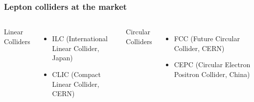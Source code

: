 \documentclass[aspectratio=169]{beamer}
\newcommand{\bluetext}[1]{%
  \textcolor{myBlue}{#1}
}
\begin{document}
\begin{frame}
  \frametitle{Lepton colliders at the market}

  \begin{columns}[c]
    \bluetext{Linear Colliders}
    \begin{itemize}
      \item ILC (International Linear Collider, Japan)
      \item CLIC (Compact Linear Collider, CERN)
    \end{itemize}
    \bluetext{Circular Colliders}
     \begin{itemize}
     \item FCC (Future Circular Collider, CERN)
     \item CEPC (Circular Electron Positron Collider, China)
     \end{itemize}


\end{columns}
\end{frame}
\end{document}

